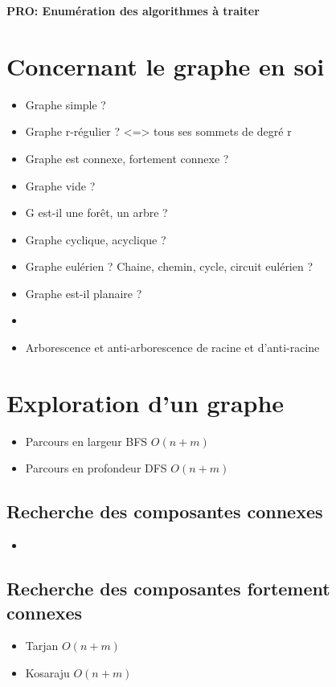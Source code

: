 \documentclass[french]{article}
\begin{document}
	\centering
	\large{\textbf{PRO: Enumération des algorithmes à traiter}}
	
	\justify
		
	\section{Concernant le graphe en soi}
	\begin{itemize}
		\item Graphe simple ?
		\item Graphe r-régulier ? <=> tous ses sommets de degré r
		\item Graphe est connexe, fortement connexe ?
		\item Graphe vide ?
		\item G est-il une forêt, un arbre ?
		\item Graphe cyclique, acyclique ?
		\item Graphe eulérien ? Chaine, chemin, cycle, circuit eulérien ?
		\item Graphe est-il planaire ?
		\item 
		\item Arborescence et anti-arborescence de racine et d'anti-racine
	\end{itemize}
	
	\section{Exploration d'un graphe}
	\begin{itemize}
		\item Parcours en largeur BFS $O(n+m)$
		\item Parcours en profondeur DFS $O(n+m)$
	\end{itemize}
		\subsection{Recherche des composantes connexes}
		\begin{itemize}
			\item 
		\end{itemize}
		\subsection{Recherche des composantes fortement connexes }
		\begin{itemize}
			\item Tarjan $O(n+m)$
			\item Kosaraju $O(n+m)$
		\end{itemize}
	
\end{document}
